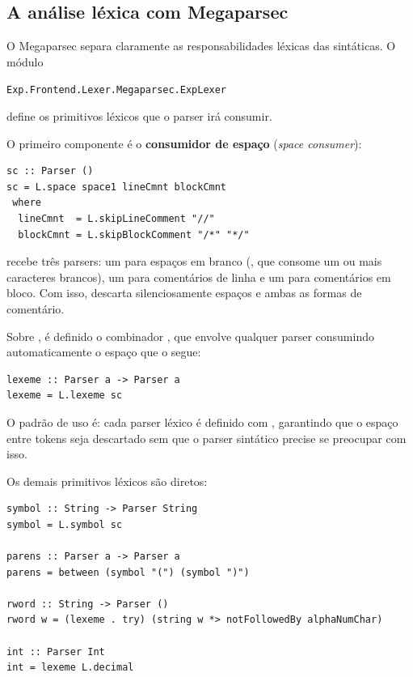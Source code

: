 \subsection{A análise léxica com Megaparsec}

O Megaparsec separa claramente as responsabilidades léxicas das
sintáticas. O módulo

\verb|Exp.Frontend.Lexer.Megaparsec.ExpLexer|

define os primitivos léxicos que o parser irá consumir.

O primeiro componente é o \textbf{consumidor de espaço}
 (\emph{space consumer}):

\begin{verbatim}
sc :: Parser ()
sc = L.space space1 lineCmnt blockCmnt
 where
  lineCmnt  = L.skipLineComment "//"
  blockCmnt = L.skipBlockComment "/*" "*/"
\end{verbatim}

 recebe três parsers: um para
espaços em branco (, que consome um
ou mais caracteres brancos), um para comentários de linha e um para
comentários em bloco. Com isso,  descarta
silenciosamente espaços e ambas as formas de comentário.

Sobre , é definido o combinador
, que envolve qualquer parser
consumindo automaticamente o espaço que o segue:

\begin{verbatim}
lexeme :: Parser a -> Parser a
lexeme = L.lexeme sc
\end{verbatim}

O padrão de uso é: cada parser léxico é definido com
, garantindo que o espaço entre
tokens seja descartado sem que o parser sintático
precise se preocupar com isso.

Os demais primitivos léxicos são diretos:

\begin{verbatim}
symbol :: String -> Parser String
symbol = L.symbol sc

parens :: Parser a -> Parser a
parens = between (symbol "(") (symbol ")")

rword :: String -> Parser ()
rword w = (lexeme . try) (string w *> notFollowedBy alphaNumChar)

int :: Parser Int
int = lexeme L.decimal
\end{verbatim}

